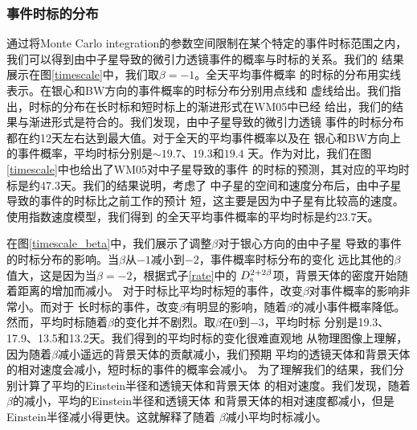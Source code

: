 \subsubsection{事件时标的分布}

通过将Monte Carlo integration的参数空间限制在某个特定的事件时标范围之内，
我们可以得到由中子星导致的微引力透镜事件的概率与时标的关系。我们的
结果展示在图\ref{timescale}中，我们取$\beta=-1$。全天平均事件概率
的时标的分布用实线表示。在银心和BW方向的事件概率的时标分布分别用点线和
虚线给出。我们指出，时标的分布在长时标和短时标上的渐进形式在WM05中已经
给出，我们的结果与渐进形式是符合的。我们发现，由中子星导致的微引力透镜
事件的时标分布都在约12天左右达到最大值。对于全天的平均事件概率以及在
银心和BW方向上的事件概率，平均时标分别是$\sim19.7$、$19.3$和$19.4$
天。作为对比，我们在图\ref{timescale}中也给出了WM05对中子星导致的事件
的时标的预测，其对应的平均时标是约47.3天。我们的结果说明，考虑了
中子星的空间和速度分布后，由中子星导致的事件的时标比之前工作的预计
短，这主要是因为中子星有比较高的速度。使用指数速度模型，我们得到
的全天平均事件概率的平均时标是约23.7天。

在图\ref{timescale_beta}中，我们展示了调整$\beta$对于银心方向的由中子星
导致的事件的时标分布的影响。当$\beta$从$-1$减小到$-2$，事件概率时标分布的变化
远比其他的$\beta$值大，这是因为当$\beta=-2$，根据式子\ref{rate}中的
$D_{\rm{s}}^{2+2\beta}$项，背景天体的密度开始随着距离的增加而减小。
对于时标比平均时标短的事件，改变$\beta$对事件概率的影响非常小。而对于
长时标的事件，改变$\beta$有明显的影响，随着$\beta$的减小事件概率降低。
然而，平均时标随着$\beta$的变化并不剧烈。取$\beta$在0到$-3$，平均时标
分别是19.3、17.9、13.5和13.2天。我们得到的平均时标的变化很难直观地
从物理图像上理解，因为随着$\beta$减小遥远的背景天体的贡献减小，我们预期
平均的透镜天体和背景天体的相对速度会减小，短时标的事件的概率会减小。
为了理解我们的结果，我们分别计算了平均的Einstein半径和透镜天体和背景天体
的相对速度。我们发现，随着$\beta$的减小，平均的Einstein半径和透镜天体
和背景天体的相对速度都减小，但是Einstein半径减小得更快。这就解释了随着
$\beta$减小平均时标减小。

